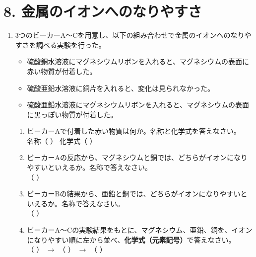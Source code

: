\section*{8. 金属のイオンへのなりやすさ}
\begin{enumerate}
    \item 3つのビーカーA〜Cを用意し、以下の組み合わせで金属のイオンへのなりやすさを調べる実験を行った。
    \begin{itemize}
        \item[A:] 硫酸銅水溶液にマグネシウムリボンを入れると、マグネシウムの表面に赤い物質が付着した。
        \item[B:] 硫酸亜鉛水溶液に銅片を入れると、変化は見られなかった。
        \item[C:] 硫酸亜鉛水溶液にマグネシウムリボンを入れると、マグネシウムの表面に黒っぽい物質が付着した。
    \end{itemize}
    \begin{enumerate}
        \item ビーカーAで付着した赤い物質は何か。名称と化学式を答えなさい。\\[0.2cm]
        名称（ \hspace{3cm} ） \hspace{1cm} 化学式（ \hspace{3cm} ）
        \item ビーカーAの反応から、マグネシウムと銅では、どちらがイオンになりやすいといえるか。名称で答えなさい。\\[0.2cm]
        （ \hspace{5cm} ）
        \item ビーカーBの結果から、亜鉛と銅では、どちらがイオンになりやすいといえるか。名称で答えなさい。\\[0.2cm]
        （ \hspace{5cm} ）
        \item ビーカーA〜Cの実験結果をもとに、マグネシウム、亜鉛、銅を、イオンになりやすい順に左から並べ、\textbf{化学式（元素記号）}で答えなさい。\\[0.2cm]
        （ \hspace{2cm} ） $\rightarrow$ （ \hspace{2cm} ） $\rightarrow$ （ \hspace{2cm} ）
    \end{enumerate}
\end{enumerate}
